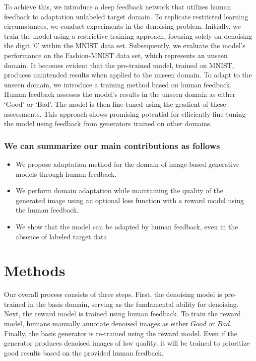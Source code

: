 \documentclass[lettersize,journal]{IEEEtran}
\begin{document}
To achieve this, we introduce a deep feedback network that utilizes human feedback to adaptation unlabeled target domain. To replicate restricted learning circumstances, we conduct experiments in the denoising problem. Initially, we train the model using a restrictive training approach, focusing solely on denoising the digit `0' within the MNIST data set. Subsequently, we evaluate the model's performance on the Fashion-MNIST data set, which represents an unseen domain. It becomes evident that the pre-trained model, trained on MNIST, produces unintended results when applied to the unseen domain. To adapt to the unseen domain, we introduce a training method based on human feedback. Human feedback assesses the model's results in the unseen domain as either `Good' or `Bad'. The model is then fine-tuned using the gradient of these assessments. This approach shows promising potential for efficiently fine-tuning the model using feedback from generators trained on other domains.

\subsubsection*{\bf We can summarize our main contributions as follows}
\begin{itemize}
\item{We propose adaptation method for the domain of image-based generative models through human feedback.}
\item{We perform domain adaptation while maintaining the quality of the generated image using an optional loss function with a reward model using the human feedback.}
\item{We show that the model can be adapted by human feedback, even in the absence of labeled target data}
\end{itemize}

\section{Methods}
Our overall process consists of three steps. First, the denoising model is pre-trained in the basis domain, serving as the fundamental ability for denoising. Next, the reward model is trained using human feedback. To train the reward model, humans manually annotate denoised images as either $Good$ or $Bad$. Finally, the basis generator is re-trained using the reward model. Even if the generator produces denoised images of low quality, it will be trained to prioritize good results based on the provided human feedback.
\end{document}
